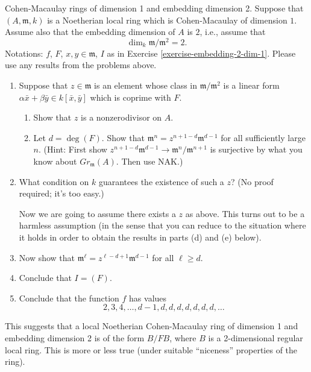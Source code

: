 \begin{exercise}
\label{exercise-CM-dim-1-embedding-dim-2}
Cohen-Macaulay rings of dimension 1 and embedding dimension 2.
Suppose that $(A, {\mathfrak m}, k)$ is a Noetherian local ring which is
Cohen-Macaulay
of dimension $1$. Assume also that the embedding dimension of $A$ is
$2$, i.e., assume that
$$
\dim_k {\mathfrak m}/{\mathfrak m}^2 = 2.
$$
Notations: $f$, $F$, $x, y\in {\mathfrak m}$, $I$ as in
Exercise \ref{exercise-embedding-2-dim-1}. Please
use any results from the problems above.
\begin{enumerate}
\item Suppose that $z\in {\mathfrak m}$ is an element whose class
in ${\mathfrak m}/{\mathfrak m}^2$ is a linear form
$\alpha \bar x + \beta \bar y \in k[\bar x, \bar y]$
which is coprime with $F$.
\begin{enumerate}
\item Show that $z$ is a nonzerodivisor on $A$.
\item Let $d = \deg(F)$.
Show that ${\mathfrak m}^n = z^{n + 1-d}{\mathfrak m}^{d-1}$
for all sufficiently large $n$. (Hint: First show
$z^{n + 1-d}{\mathfrak m}^{d-1} \to {\mathfrak m}^n/{\mathfrak m}^{n + 1}$
is surjective by what you know about $Gr_{\mathfrak m}(A)$. Then use NAK.)
\end{enumerate}
\item What condition on $k$ guarantees the existence of
such a $z$? (No proof required; it's too easy.)

\noindent
Now we are going to assume there exists a $z$ as above. This turns out
to be a harmless assumption (in the sense that you can reduce to
the situation where it holds in order to obtain the results in
parts (d) and (e) below).
\item Now show that ${\mathfrak m}^\ell = z^{\ell - d + 1} {\mathfrak m}^{d-1}$
for all $\ell \geq d$.
\item Conclude that $I = (F)$.
\item Conclude that the function $f$ has values
$$
2, 3, 4, \ldots, d-1, d, d, d, d, d, d, d, \ldots
$$
\end{enumerate}
\end{exercise}

\begin{remark}
\label{remark-CM-dim-1-embedding-dim-2}
This suggests that a local Noetherian Cohen-Macaulay ring of dimension 1
and embedding dimension 2 is of the form $B/FB$, where $B$ is a 2-dimensional
regular local ring. This is more or less true (under suitable ``niceness''
properties of the ring).
\end{remark}






